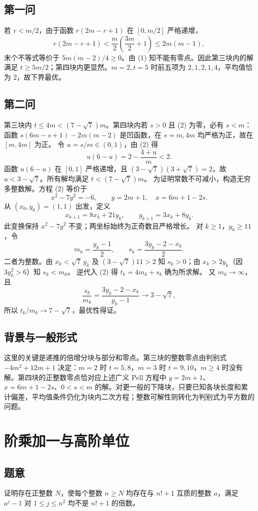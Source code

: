 \documentclass[UTF8,11pt,a4paper,fontset=fandol]{ctexart}
\begin{document}
\subsection*{第一问}
若 $r<m/2$，由于函数 $r(2m-r+1)$ 在 $[0,m/2]$ 严格递增，
\[
r(2m-r+1)<\frac m2\left(\frac{3m}2+1\right)
\le2m(m-1),
\]
末个不等式等价于 $5m(m-2)/4\ge0$。由 (1) 知不能有零点。因此第三块内的解满足 $t\ge5m/2$；第四块内更显然。$m=2,t=5$ 时前五项为 $2,1,2,1,4$，平均值恰为 $2$，故下界最优。
\subsection*{第二问}
第三块内 $t\le4m< (7-\sqrt7)m$。第四块内若 $s>0$ 且 (2) 为零，必有 $s<m$：函数 $s(6m-s+1)-2m(m-2)$ 是凹函数，在 $s=m,4m$ 均严格为正，故在 $[m,4m]$ 为正。
令 $u=s/m\in(0,1)$，由 (2) 得
\[
u(6-u)=2-\frac{4+u}{m}<2.
\]
函数 $u(6-u)$ 在 $[0,1]$ 严格递增，且 $(3-\sqrt7)(3+\sqrt7)=2$，故 $u<3-\sqrt7$。所有解均满足 $t<(7-\sqrt7)m$。
为证明常数不可减小，构造无穷多整数解。方程 (2) 等价于
\[
x^2-7y^2=-6,\qquad y=2m+1,\quad x=6m+1-2s.
\]
从 $(x_0,y_0)=(1,1)$ 出发，定义
\[
x_{k+1}=8x_k+21y_k,\qquad y_{k+1}=3x_k+8y_k.
\]
此变换保持 $x^2-7y^2$ 不变；两坐标始终为正奇数且严格增长。
对 $k\ge1$，$y_k\ge11$，令
\[
m_k=\frac{y_k-1}{2},\qquad s_k=\frac{3y_k-2-x_k}{2}.
\]
二者为整数。由 $x_k<\sqrt7\,y_k$ 及 $(3-\sqrt7)11>2$ 知 $s_k>0$；由 $x_k>2y_k$（因 $3y_k^2>6$）知 $s_k<m_k$。
逆代入 (2) 得 $t_k=4m_k+s_k$ 确为所求解。
又 $m_k\to\infty$，且
\[
\frac{s_k}{m_k}
=\frac{3y_k-2-x_k}{y_k-1}\longrightarrow3-\sqrt7,
\]
所以 $t_k/m_k\to7-\sqrt7$，最优性得证。
\subsection*{背景与一般形式}
这里的关键是递推的倍增分块与部分和零点。第三块的整数零点由判别式 $-4m^2+12m+1$ 决定：$m=2$ 时 $t=5,8$，$m=3$ 时 $t=9,10$，$m\ge4$ 时没有解。第四块的正整数零点恰对应上述广义 Pell 方程中 $y=2m+1$、$x=6m+1-2s$、$0<s<m$ 的解。对更一般的下降块，只要已知各块长度和累计偏差，平均值条件仍化为块内二次方程；整数可解性则转化为判别式为平方数的问题。

\section{阶乘加一与高阶单位}
\subsection*{题意}
证明存在正整数 $N$，使每个整数 $n\ge N$ 均存在与 $n!+1$ 互质的整数 $a$，满足 $a^j-1$ 对 $1\le j\le n^2$ 均不是 $n!+1$ 的倍数。
\end{document}
